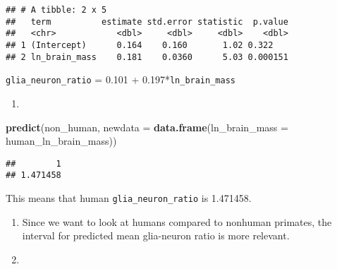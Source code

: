 \documentclass[
]{article}
\newenvironment{Shaded}{\begin{snugshade}}{\end{snugshade}}
\newcommand{\AttributeTok}[1]{\textcolor[rgb]{0.13,0.29,0.53}{#1}}
\newcommand{\DecValTok}[1]{\textcolor[rgb]{0.00,0.00,0.81}{#1}}
\newcommand{\FunctionTok}[1]{\textcolor[rgb]{0.13,0.29,0.53}{\textbf{#1}}}
\newcommand{\NormalTok}[1]{#1}
\newcommand{\OtherTok}[1]{\textcolor[rgb]{0.56,0.35,0.01}{#1}}
\newcommand{\SpecialCharTok}[1]{\textcolor[rgb]{0.81,0.36,0.00}{\textbf{#1}}}
\providecommand{\tightlist}{%
  \setlength{\itemsep}{0pt}\setlength{\parskip}{0pt}}
\begin{document}
\begin{Shaded}
\end{Shaded}

\begin{verbatim}
## # A tibble: 2 x 5
##   term          estimate std.error statistic  p.value
##   <chr>            <dbl>     <dbl>     <dbl>    <dbl>
## 1 (Intercept)      0.164    0.160       1.02 0.322   
## 2 ln_brain_mass    0.181    0.0360      5.03 0.000151
\end{verbatim}

\texttt{glia\_neuron\_ratio} = 0.101 + 0.197*\texttt{ln\_brain\_mass}

\begin{enumerate}
\def\labelenumi{\alph{enumi})}
\setcounter{enumi}{1}
\tightlist
\item
\end{enumerate}

\begin{Shaded}
\begin{Highlighting}[]
\FunctionTok{predict}\NormalTok{(non\_human, }\AttributeTok{newdata =} \FunctionTok{data.frame}\NormalTok{(}\AttributeTok{ln\_brain\_mass =}\NormalTok{ human\_ln\_brain\_mass))}
\end{Highlighting}
\end{Shaded}

\begin{verbatim}
##        1 
## 1.471458
\end{verbatim}

This means that human \texttt{glia\_neuron\_ratio} is 1.471458.

\begin{enumerate}
\def\labelenumi{\alph{enumi})}
\setcounter{enumi}{2}
\item
  Since we want to look at humans compared to nonhuman primates, the
  interval for predicted mean glia-neuron ratio is more relevant.
\item
\end{enumerate}
\end{document}

